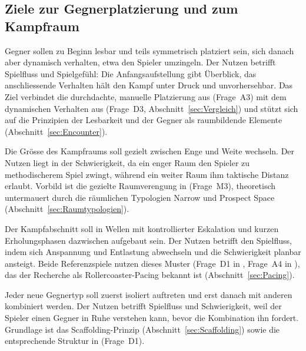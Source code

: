 \documentclass[../Main.tex]{subfiles}
\begin{document}
\subsection{Ziele zur Gegnerplatzierung und zum Kampfraum}

\begin{description}[style=nextline, leftmargin=0pt, itemsep=0.8em]
    \item[\textbf{Designziel 5: Lesbare Platzierung, dynamisches Verhalten}]
    Gegner sollen zu Beginn lesbar und teils symmetrisch platziert sein, sich danach aber dynamisch verhalten, etwa den Spieler umzingeln. Der Nutzen betrifft Spielfluss und Spielgefühl: Die Anfangsaufstellung gibt Überblick, das anschliessende Verhalten hält den Kampf unter Druck und unvorhersehbar. Das Ziel verbindet die durchdachte, manuelle Platzierung aus  (Frage~A3) mit dem dynamischen Verhalten aus  (Frage~D3, Abschnitt~\ref{sec:Vergleich}) und stützt sich auf die Prinzipien der Lesbarkeit und der Gegner als raumbildende Elemente (Abschnitt~\ref{sec:Encounter}).

    \item[\textbf{Designziel 6: Der Raum als Druckmittel}]
    Die Grösse des Kampfraums soll gezielt zwischen Enge und Weite wechseln. Der Nutzen liegt in der Schwierigkeit, da ein enger Raum den Spieler zu methodischerem Spiel zwingt, während ein weiter Raum ihm taktische Distanz erlaubt. Vorbild ist die gezielte Raumverengung in  (Frage~M3), theoretisch untermauert durch die räumlichen Typologien Narrow und Prospect Space (Abschnitt~\ref{sec:Raumtypologien}).

    \item[\textbf{Designziel 7: Wellenstruktur mit Erholungsphasen}]
    Der Kampfabschnitt soll in Wellen mit kontrollierter Eskalation und kurzen Erholungsphasen dazwischen aufgebaut sein. Der Nutzen betrifft den Spielfluss, indem sich Anspannung und Entlastung abwechseln und die Schwierigkeit planbar ansteigt. Beide Referenzspiele nutzen dieses Muster (Frage~D1 in , Frage~A4 in ), das der Recherche als Rollercoaster-Pacing bekannt ist (Abschnitt~\ref{sec:Pacing}).

    \item[\textbf{Designziel 8: Gestaffelte Einführung neuer Gegner}]
    Jeder neue Gegnertyp soll zuerst isoliert auftreten und erst danach mit anderen kombiniert werden. Der Nutzen betrifft Spielfluss und Schwierigkeit, weil der Spieler einen Gegner in Ruhe verstehen kann, bevor die Kombination ihn fordert. Grundlage ist das Scaffolding-Prinzip (Abschnitt~\ref{sec:Scaffolding}) sowie die entsprechende Struktur in  (Frage~D1).
\end{description}
\end{document}
